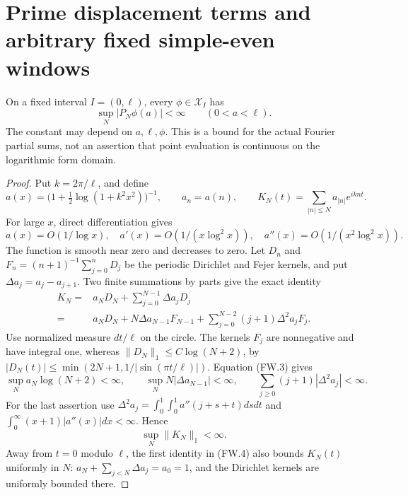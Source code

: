 \section{Prime displacement terms and arbitrary fixed simple-even windows}
\label{sec:spectral-all-window-endpoint}

\begin{lemma}
\label{AC-S42-kernel}
On a fixed interval \(I=(0,\ell)\), every \(\phi\in\mathcal X_I\)
has
\[
             \sup_N |P_N\phi(a)|<\infty
                         \qquad(0<a<\ell).               \tag{FW.1}
\]
The constant may depend on \(a,\ell,\phi\).  This is a bound
for the actual Fourier partial sums, not an assertion that point
evaluation is continuous on the logarithmic form domain.
\end{lemma}
\begin{proof}
Put \(k=2\pi/\ell\), and define
\[
 a(x)=\bigl(1+\tfrac12\log(1+k^2x^2)\bigr)^{-1},
 \qquad a_n=a(n),\qquad
 K_N(t)=\sum_{|n|\leq N}a_{|n|}e^{iknt}.                 \tag{FW.2}
\]
For large \(x\), direct differentiation gives
\[
 a(x)=O(1/\log x),\quad
 a'(x)=O(1/(x\log^2x)),\quad
 a''(x)=O(1/(x^2\log^2x)).                              \tag{FW.3}
\]
The function is smooth near zero and decreases to zero.
Let \(D_n\) and \(F_n=(n+1)^{-1}\sum_{j=0}^nD_j\) be
the periodic Dirichlet and Fejer kernels, and put
\(\Delta a_j=a_j-a_{j+1}\).
Two finite summations by parts give the exact identity
\[
 \begin{split}
 K_N={}&a_ND_N+\sum_{j=0}^{N-1}\Delta a_jD_j\\
     ={}&a_ND_N+N\Delta a_{N-1}F_{N-1}
             +\sum_{j=0}^{N-2}(j+1)\Delta^2a_jF_j.
 \end{split}                                             \tag{FW.4}
\]
Use normalized measure \(dt/\ell\) on the circle.
The kernels \(F_j\) are nonnegative and have integral one,
whereas \(\|D_N\|_1\leq C\log(N+2)\), by
\(|D_N(t)|\leq\min(2N+1,1/|\sin(\pi t/\ell)|)\).
Equation (FW.3) gives
\[
 \sup_N a_N\log(N+2)<\infty,\qquad
 \sup_N N|\Delta a_{N-1}|<\infty,\qquad
 \sum_{j\geq0}(j+1)|\Delta^2a_j|<\infty.                \tag{FW.5}
\]
For the last assertion use
\(\Delta^2a_j=\int_0^1\int_0^1a''(j+s+t)dsdt\)
and \(\int_0^\infty(x+1)|a''(x)|dx<\infty\).
Hence
\[
                          \sup_N\|K_N\|_1<\infty.        \tag{FW.6}
\]
Away from \(t=0\) modulo \(\ell\), the first identity in
(FW.4) also bounds \(K_N(t)\) uniformly in \(N\):
\(a_N+\sum_{j<N}\Delta a_j=a_0=1\), and the Dirichlet kernels
are uniformly bounded there.


\end{proof}
